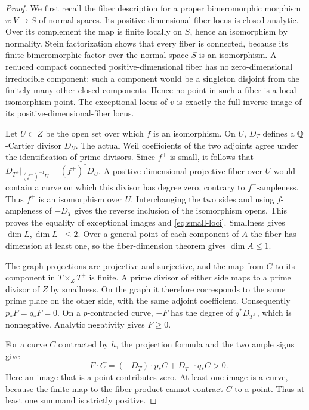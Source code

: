\begin{proof}
We first recall the fiber description for a proper bimeromorphic
morphism $v:V\to S$ of normal spaces.  Its positive-dimensional-fiber
locus is closed analytic.  Over its complement the map is finite
locally on $S$, hence an isomorphism by normality.  Stein factorization
shows that every fiber is connected, because its finite bimeromorphic
factor over the normal space $S$ is an isomorphism.  A reduced compact
connected positive-dimensional fiber has no zero-dimensional
irreducible component: such a component would be a singleton disjoint
from the finitely many other closed components.  Hence no point in
such a fiber is a local isomorphism point.  The exceptional locus of
$v$ is exactly the full inverse image of its positive-dimensional-fiber
locus.

Let $U\subset Z$ be the open set over which $f$ is an isomorphism.
On $U$, $D_T$ defines a $\mathbb{Q}$-Cartier divisor $D_U$.  The actual Weil
coefficients of the two adjoints agree under the identification of
prime divisors.  Since $f^+$ is small, it follows that
$D_{T^+}|_{(f^+)^{-1}U}=(f^+)^*D_U$.  A positive-dimensional projective
fiber over $U$ would contain a curve on which this divisor has degree
zero, contrary to $f^+$-ampleness.  Thus $f^+$ is an isomorphism over
$U$.  Interchanging the two sides and using $f$-ampleness of $-D_T$
gives the reverse inclusion of the isomorphism opens.  This proves
the equality of exceptional images and \eqref{eq:small-loci}.
Smallness gives $\dim L,\dim L^+\leq2$.  Over a general point of each
component of $A$ the fiber has dimension at least one, so the
fiber-dimension theorem gives $\dim A\leq1$.

The graph projections are projective and surjective, and the map from
$G$ to its component in $T\times_ZT^+$ is finite.  A prime divisor of
either side maps to a prime divisor of $Z$ by smallness.  On the graph
it therefore corresponds to the same prime place on the other side,
with the same adjoint coefficient.  Consequently $p_*F=q_*F=0$.
On a $p$-contracted curve, $-F$ has the degree of $q^*D_{T^+}$, which
is nonnegative.  Analytic negativity gives $F\geq0$.

For a curve $C$ contracted by $h$, the projection formula and the two
ample signs give
\[
 -F\cdot C=(-D_T)\cdot p_*C+D_{T^+}\cdot q_*C>0.
\]
Here an image that is a point contributes zero.  At least one image is
a curve, because the finite map to the fiber product cannot contract
$C$ to a point.  Thus at least one summand is strictly positive.


\end{proof}
